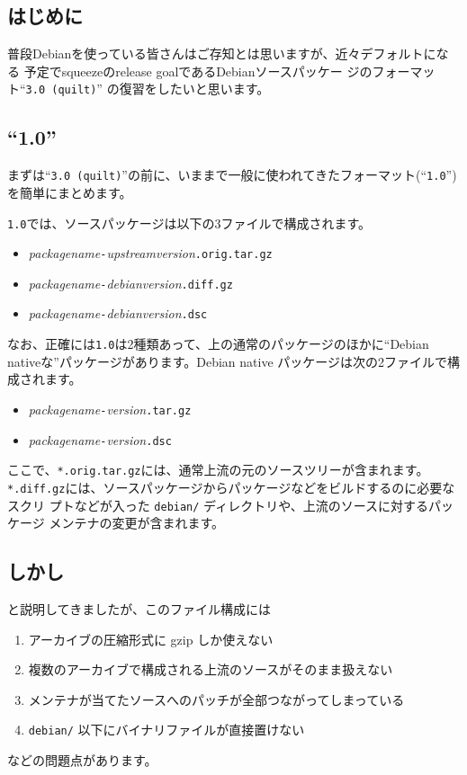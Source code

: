 \documentclass[mingoth,a4paper]{jsarticle}
\begin{document}
\subsection{はじめに}
普段Debianを使っている皆さんはご存知とは思いますが、近々デフォルトになる
予定でsqueezeのrelease goalであるDebianソースパッケー
ジのフォーマット``\verb|3.0 (quilt)|'' の復習をしたいと思います。
\subsection{``1.0''}
まずは``\verb|3.0 (quilt)|''の前に、いままで一般に使われてきたフォーマット(``\verb|1.0|'')を簡単にまとめます。

\verb|1.0|では、ソースパッケージは以下の3ファイルで構成されます。
\begin{itemize}
 \item \textit{packagename}\verb|-|\textit{upstreamversion}\verb|.orig.tar.gz|
 \item \textit{packagename}\verb|-|\textit{debianversion}\verb|.diff.gz|
 \item \textit{packagename}\verb|-|\textit{debianversion}\verb|.dsc|
\end{itemize}

なお、正確には\verb|1.0|は2種類あって、上の通常のパッケージのほかに``Debian
nativeな''パッケージがあります。Debian native パッケージは次の2ファイルで構成されます。
\begin{itemize}
 \item \textit{packagename}\verb|-|\textit{version}\verb|.tar.gz|
 \item \textit{packagename}\verb|-|\textit{version}\verb|.dsc|
\end{itemize}

ここで、\verb|*.orig.tar.gz|には、通常上流の元のソースツリーが含まれます。
\verb|*.diff.gz|には、ソースパッケージからパッケージなどをビルドするのに必要なスクリ
プトなどが入った \verb|debian/| ディレクトリや、上流のソースに対するパッケージ
メンテナの変更が含まれます。

\subsection{しかし}
と説明してきましたが、このファイル構成には
\begin{enumerate}
 \item アーカイブの圧縮形式に gzip しか使えない
 \item 複数のアーカイブで構成される上流のソースがそのまま扱えない
 \item メンテナが当てたソースへのパッチが全部つながってしまっている
 \item \verb|debian/| 以下にバイナリファイルが直接置けない
\end{enumerate}
などの問題点があります。
\end{document}
